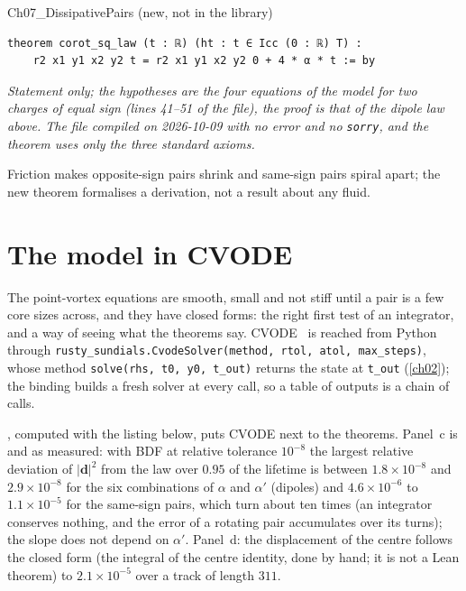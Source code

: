\begin{leanbox}{Ch07\_DissipativePairs (new, not in the library)}
\begin{lstlisting}[style=lean,basicstyle=\ttfamily\footnotesize]
theorem corot_sq_law (t : ℝ) (ht : t ∈ Icc (0 : ℝ) T) :
    r2 x1 y1 x2 y2 t = r2 x1 y1 x2 y2 0 + 4 * α * t := by
\end{lstlisting}
\nopagebreak[4]\smallskip\noindent\textit{Statement only; the hypotheses are the four equations of the model for two charges of equal sign (lines 41--51 of the file), the proof is that of the dipole law above. The file compiled on 2026-10-09 with no error and no \texttt{sorry}, and the theorem uses only the three standard axioms.}
\end{leanbox}

Friction makes opposite-sign pairs shrink and same-sign pairs spiral apart; the new theorem formalises a derivation, not a result about any fluid.

\section{The model in CVODE}\label{ch07:cvode}

The point-vortex equations are smooth, small and not stiff until a pair is a few core sizes across, and they have closed forms: the right first test of an integrator, and a way of seeing what the theorems say. CVODE~\cite{Hindmarsh2005} is reached from
Python through \texttt{rusty\_sundials.CvodeSolver(method, rtol, atol, max\_steps)}, whose method \texttt{solve(rhs, t0, y0, t\_out)} returns the state at \texttt{t\_out} (\cref{ch02}); the binding builds a fresh solver at every call, so a table of outputs is a chain of calls.

, computed with the listing below, puts CVODE next to the theorems. Panel~c is  and  as measured: with BDF at relative tolerance $10^{-8}$ the largest relative
deviation of $|\mathbf d|^2$ from the law over $0.95$ of the lifetime is between $1.8\times10^{-8}$ and $2.9\times10^{-8}$ for the six combinations of $\alpha$ and $\alpha'$ (dipoles) and $4.6\times10^{-6}$ to $1.1\times10^{-5}$ for the same-sign pairs, which turn about ten times (an integrator conserves nothing, and the error of a rotating pair accumulates over its turns); the slope does not depend on $\alpha'$.
Panel~d: the displacement of the centre follows the closed form (the integral of the centre identity, done by hand; it is not a Lean theorem) to $2.1\times10^{-5}$ over a track of length $311$.


